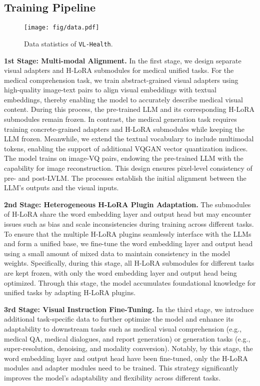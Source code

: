 \subsection{Training Pipeline}

\begin{figure}[t]
    \centering
    \hspace{-4mm}
    \texttt{[image: fig/data.pdf]}
    \caption{Data statistics of \texttt{VL-Health}. }
    \label{fig:data}
\end{figure}
\noindent \textbf{1st Stage: Multi-modal Alignment.} 
In the first stage, we design separate visual adapters and H-LoRA submodules for medical unified tasks. For the medical comprehension task, we train abstract-grained visual adapters using high-quality image-text pairs to align visual embeddings with textual embeddings, thereby enabling the model to accurately describe medical visual content. During this process, the pre-trained LLM and its corresponding H-LoRA submodules remain frozen. In contrast, the medical generation task requires training concrete-grained adapters and H-LoRA submodules while keeping the LLM frozen. Meanwhile, we extend the textual vocabulary to include multimodal tokens, enabling the support of additional VQGAN vector quantization indices. The model trains on image-VQ pairs, endowing the pre-trained LLM with the capability for image reconstruction. This design ensures pixel-level consistency of pre- and post-LVLM. The processes establish the initial alignment between the LLM’s outputs and the visual inputs.

\noindent \textbf{2nd Stage: Heterogeneous H-LoRA Plugin Adaptation.}  
The submodules of H-LoRA share the word embedding layer and output head but may encounter issues such as bias and scale inconsistencies during training across different tasks. To ensure that the multiple H-LoRA plugins seamlessly interface with the LLMs and form a unified base, we fine-tune the word embedding layer and output head using a small amount of mixed data to maintain consistency in the model weights. Specifically, during this stage, all H-LoRA submodules for different tasks are kept frozen, with only the word embedding layer and output head being optimized. Through this stage, the model accumulates foundational knowledge for unified tasks by adapting H-LoRA plugins.



\noindent \textbf{3rd Stage: Visual Instruction Fine-Tuning.}  
In the third stage, we introduce additional task-specific data to further optimize the model and enhance its adaptability to downstream tasks such as medical visual comprehension (e.g., medical QA, medical dialogues, and report generation) or generation tasks (e.g., super-resolution, denoising, and modality conversion). Notably, by this stage, the word embedding layer and output head have been fine-tuned, only the H-LoRA modules and adapter modules need to be trained. This strategy significantly improves the model's adaptability and flexibility across different tasks.

